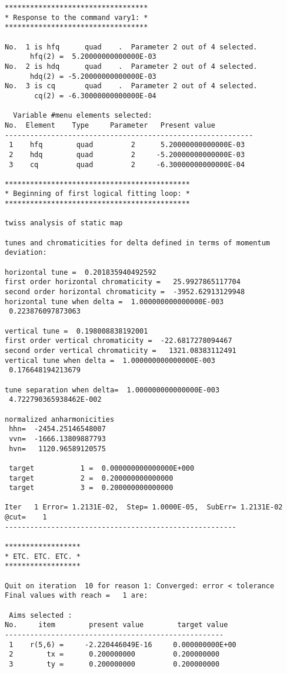 \begin{footnotesize}
\begin{verbatim}
**********************************
* Response to the command vary1: *
**********************************

No.  1 is hfq      quad    .  Parameter 2 out of 4 selected.
      hfq(2) =  5.20000000000000E-03
No.  2 is hdq      quad    .  Parameter 2 out of 4 selected.
      hdq(2) = -5.20000000000000E-03
No.  3 is cq       quad    .  Parameter 2 out of 4 selected.
       cq(2) = -6.30000000000000E-04

  Variable #menu elements selected:
No.  Element    Type     Parameter   Present value
-----------------------------------------------------------
 1    hfq        quad         2      5.20000000000000E-03
 2    hdq        quad         2     -5.20000000000000E-03
 3    cq         quad         2     -6.30000000000000E-04

********************************************
* Beginning of first logical fitting loop: *
********************************************

twiss analysis of static map

tunes and chromaticities for delta defined in terms of momentum deviation:

horizontal tune =  0.201835940492592
first order horizontal chromaticity =   25.9927865117704
second order horizontal chromaticity =  -3952.62913129948
horizontal tune when delta =  1.000000000000000E-003
 0.223876097873063

vertical tune =  0.198008838192001
first order vertical chromaticity =  -22.6817278094467
second order vertical chromaticity =   1321.08383112491
vertical tune when delta =  1.000000000000000E-003
 0.176648194213679

tune separation when delta=  1.000000000000000E-003
 4.722790365938462E-002

normalized anharmonicities
 hhn=  -2454.25146548007
 vvn=  -1666.13809887793
 hvn=   1120.96589120575

 target           1 =  0.000000000000000E+000
 target           2 =  0.200000000000000
 target           3 =  0.200000000000000

Iter   1 Error= 1.2131E-02,  Step= 1.0000E-05,  SubErr= 1.2131E-02 @cut=    1
-------------------------------------------------------

******************
* ETC. ETC. ETC. *
******************

Quit on iteration  10 for reason 1: Converged: error < tolerance
Final values with reach =   1 are:

 Aims selected :
No.     item        present value        target value
----------------------------------------------------
 1    r(5,6) =     -2.220446049E-16     0.000000000E+00
 2        tx =      0.200000000         0.200000000
 3        ty =      0.200000000         0.200000000


\end{verbatim}
\end{footnotesize}
